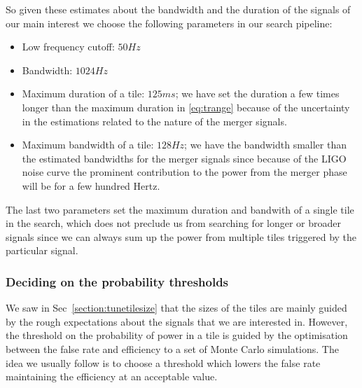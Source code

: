 \documentclass{article}
\begin{document}
So given these estimates about the bandwidth and the duration of the 
signals of our main interest we choose the following parameters in our
search pipeline:
\begin{itemize}
\item Low frequency cutoff: $50 Hz$
\item Bandwidth: $1024 Hz$
\item Maximum duration of a tile: $125 ms$; we have set the duration 
a few times longer than the maximum duration in \eqref{eq:trange}
because of the uncertainty in the estimations related to the nature 
of the merger signals.
\item Maximum bandwidth of a tile: $128 Hz$; we have the bandwidth 
smaller than the estimated bandwidths for the merger signals since
because of the LIGO noise curve the prominent contribution to the 
power from the merger phase will be for a few hundred Hertz.
\end{itemize}
The last two parameters set the maximum duration and bandwith of 
a single tile in the search,  which does not preclude us from searching
for longer or broader signals since we can always sum up the power
from multiple tiles triggered by the particular signal. 
    

\subsubsection{Deciding on the probability thresholds}


We saw in Sec~\ref{section:tunetilesize} that the sizes of the tiles
are mainly guided by the rough expectations about the signals that 
we are interested in.  However, the threshold on the probability
of power in a tile is guided by the optimisation between the false 
rate and efficiency to a set of Monte Carlo simulations.  The idea
we usually follow is to choose a threshold which lowers the false rate 
maintaining the efficiency at an acceptable value.
\end{document}
